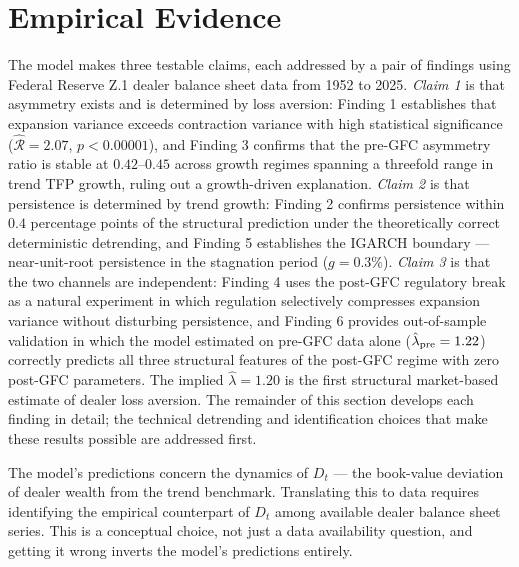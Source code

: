\documentclass[12pt,a4paper]{article}
\theoremstyle{definition}
\begin{document}
\section{Empirical Evidence}
\label{sec:empirical}

The model makes three testable claims, each addressed by a pair of
findings using Federal Reserve Z.1 dealer balance sheet data from 1952
to 2025. \emph{Claim 1} is that asymmetry exists and is determined by
loss aversion: Finding 1 establishes that expansion variance exceeds
contraction variance with high statistical significance
($\hat{\mathcal{R}} = 2.07$, $p < 0.00001$), and Finding 3 confirms
that the pre-GFC asymmetry ratio is stable at $0.42$--$0.45$ across
growth regimes spanning a threefold range in trend TFP growth, ruling
out a growth-driven explanation. \emph{Claim 2} is that persistence is
determined by trend growth: Finding 2 confirms persistence within $0.4$
percentage points of the structural prediction under the theoretically
correct deterministic detrending, and Finding 5 establishes the IGARCH
boundary --- near-unit-root persistence in the stagnation period
($g = 0.3\%$). \emph{Claim 3} is that the two channels are
independent: Finding 4 uses the post-GFC regulatory break as a natural
experiment in which regulation selectively compresses expansion variance
without disturbing persistence, and Finding 6 provides out-of-sample
validation in which the model estimated on pre-GFC data alone
($\hat{\lambda}_{\rm pre} = 1.22$) correctly predicts all three
structural features of the post-GFC regime with zero post-GFC
parameters. The implied $\hat{\lambda} = 1.20$ is the first structural
market-based estimate of dealer loss aversion. The remainder of this
section develops each finding in detail; the technical detrending and
identification choices that make these results possible are addressed
first.

The model's predictions concern the dynamics of $D_t$ --- the book-value
deviation of dealer wealth from the trend benchmark. Translating this to
data requires identifying the empirical counterpart of $D_t$ among
available dealer balance sheet series. This is a conceptual choice, not
just a data availability question, and getting it wrong inverts the
model's predictions entirely.
\end{document}
